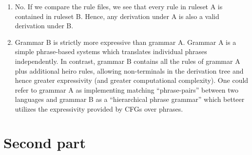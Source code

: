\documentclass[a4paper,oneside,reqno]{amsart}
\begin{document}
\begin{enumerate}[label=\arabic*.]
  \item No. If we compare the rule files, we see that every rule in ruleset A is
    contained in ruleset B. Hence, any derivation under A is also a valid derivation under
    B.

  \item Grammar B is strictly more expressive than grammar A. Grammar A is a simple phrase-based
    systems which translates individual phrases independently. In contrast, grammar B contains all
    the rules of grammar A plus additional heiro rules, allowing non-terminals in the derivation
    tree and hence greater expressivity (and greater computational complexity). One could
    refer to grammar A as implementing matching ``phrase-pairs'' between two languages
    and grammar B as a ``hierarchical phrase grammar'' which betteer utilizes the
    expressivity provided by CFGs over phrases.
\end{enumerate}

\section{Second part}
\end{document}
